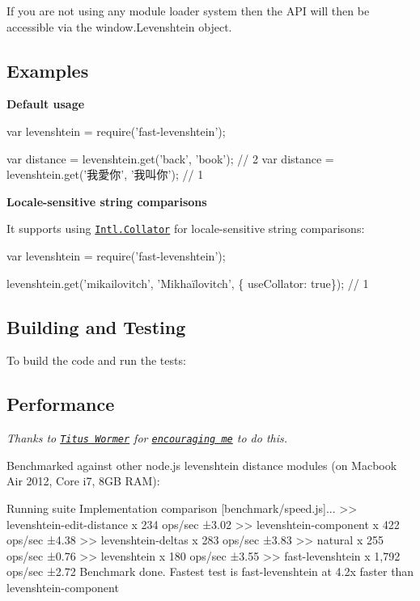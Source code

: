 If you are not using any module loader system then the A\+PI will then be accessible via the {\ttfamily window.\+Levenshtein} object.

\subsection*{Examples}

{\bfseries Default usage}


\begin{DoxyCode}
var levenshtein = require('fast-levenshtein');

var distance = levenshtein.get('back', 'book');   // 2
var distance = levenshtein.get('我愛你', '我叫你');   // 1
\end{DoxyCode}


{\bfseries Locale-\/sensitive string comparisons}

It supports using \href{https://developer.mozilla.org/en-US/docs/Web/JavaScript/Reference/Global_Objects/Collator}{\tt Intl.\+Collator} for locale-\/sensitive string comparisons\+:


\begin{DoxyCode}
var levenshtein = require('fast-levenshtein');

levenshtein.get('mikailovitch', 'Mikhaïlovitch', \{ useCollator: true\});
// 1
\end{DoxyCode}


\subsection*{Building and Testing}

To build the code and run the tests\+:




\subsection*{Performance}

{\itshape Thanks to \href{https://github.com/wooorm}{\tt Titus Wormer} for \href{https://github.com/hiddentao/fast-levenshtein/issues/1}{\tt encouraging me} to do this.}

Benchmarked against other node.\+js levenshtein distance modules (on Macbook Air 2012, Core i7, 8\+GB R\+AM)\+:


\begin{DoxyCode}
Running suite Implementation comparison [benchmark/speed.js]...
>> levenshtein-edit-distance x 234 ops/sec ±3.02%
>> levenshtein-component x 422 ops/sec ±4.38%
>> levenshtein-deltas x 283 ops/sec ±3.83%
>> natural x 255 ops/sec ±0.76%
>> levenshtein x 180 ops/sec ±3.55%
>> fast-levenshtein x 1,792 ops/sec ±2.72%
Benchmark done.
Fastest test is fast-levenshtein at 4.2x faster than levenshtein-component
\end{DoxyCode}



